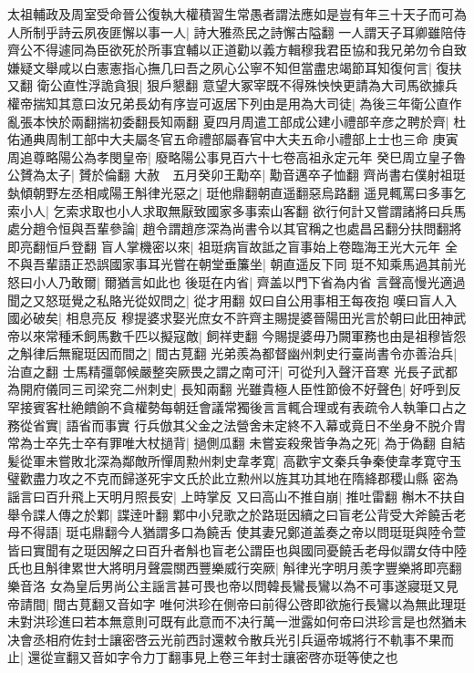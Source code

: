 太祖輔政及周室受命晉公復執大權積習生常愚者謂法應如是豈有年三十天子而可為人所制乎詩云夙夜匪懈以事一人|{
	詩大雅烝民之詩懈古隘翻}
一人謂天子耳卿雖陪侍齊公不得遽同為臣欲死於所事宜輔以正道勸以義方輯穆我君臣協和我兄弟勿令自致嫌疑文舉咸以白憲憲指心撫几曰吾之夙心公寧不知但當盡忠竭節耳知復何言|{
	復扶又翻}
衛公直性浮詭貪狠|{
	狠戶懇翻}
意望大冢宰既不得殊怏怏更請為大司馬欲據兵權帝揣知其意曰汝兄弟長幼有序豈可返居下列由是用為大司徒|{
	為後三年衛公直作亂張本怏於兩翻揣初委翻長知兩翻}
夏四月周遣工部成公建小禮部辛彦之聘於齊|{
	杜佑通典周制工部中大夫屬冬官五命禮部屬春官中大夫五命小禮部上士也三命}
庚寅周追尊略陽公為孝閔皇帝|{
	廢略陽公事見百六十七卷高祖永定元年}
癸巳周立皇子魯公贇為太子|{
	贇於倫翻}
大赦　五月癸卯王勱卒|{
	勱音邁卒子恤翻}
齊尚書右僕射祖珽埶傾朝野左丞相咸陽王斛律光惡之|{
	珽他鼎翻朝直遥翻惡烏路翻}
遥見輒罵曰多事乞索小人|{
	乞索求取也小人求取無厭致國家多事索山客翻}
欲行何計又嘗謂諸將曰兵馬處分趙令恒與吾輩參論|{
	趙令謂趙彦深為尚書令以其官稱之也處昌呂翻分扶問翻將即亮翻恒戶登翻}
盲人掌機密以來|{
	祖珽病盲故詆之盲事始上卷臨海王光大元年}
全不與吾輩語正恐誤國家事耳光嘗在朝堂垂簾坐|{
	朝直遥反下同}
珽不知乘馬過其前光怒曰小人乃敢爾|{
	爾猶言如此也}
後珽在内省|{
	齊盖以門下省為内省}
言聲高慢光適過聞之又怒珽覺之私賂光從奴問之|{
	從才用翻}
奴曰自公用事相王每夜抱嘆曰盲人入國必破矣|{
	相息亮反}
穆提婆求娶光庶女不許齊主賜提婆晉陽田光言於朝曰此田神武帝以來常種禾飼馬數千匹以擬寇敵|{
	飼祥吏翻}
今賜提婆毋乃闕軍務也由是祖穆皆怨之斛律后無寵珽因而間之|{
	間古莧翻}
光弟羨為都督幽州刺史行臺尚書令亦善治兵|{
	治直之翻}
士馬精彊鄣候嚴整突厥畏之謂之南可汗|{
	可從刋入聲汗音寒}
光長子武都為開府儀同三司梁兖二州刺史|{
	長知兩翻}
光雖貴極人臣性節儉不好聲色|{
	好呼到反}
罕接賓客杜絶饋餉不貪權勢每朝廷會議常獨後言言輒合理或有表疏令人執筆口占之務從省實|{
	語省而事實}
行兵倣其父金之法營舍未定終不入幕或竟日不坐身不脱介胄常為士卒先士卒有罪唯大杖撾背|{
	撾側瓜翻}
未嘗妄殺衆皆争為之死|{
	為于偽翻}
自結髪從軍未嘗敗北深為鄰敵所憚周勲州刺史韋孝寛|{
	高歡宇文秦兵争秦使韋孝寛守玉璧歡盡力攻之不克而歸遂死宇文氏於此立勲州以旌其功其地在隋絳郡稷山縣}
密為謡言曰百升飛上天明月照長安|{
	上時掌反}
又曰高山不推自崩|{
	推吐雷翻}
槲木不扶自舉令諜人傳之於鄴|{
	諜逹叶翻}
鄴中小兒歌之於路珽因續之曰盲老公背受大斧饒舌老母不得語|{
	珽屯鼎翻今人猶謂多口為饒舌}
使其妻兄鄭道盖奏之帝以問珽珽與陸令萱皆曰實聞有之珽因解之曰百升者斛也盲老公謂臣也與國同憂饒舌老母似謂女侍中陸氏也且斛律累世大將明月聲震關西豐樂威行突厥|{
	斛律光字明月羨字豐樂將即亮翻樂音洛}
女為皇后男尚公主謡言甚可畏也帝以問韓長鸞長鸞以為不可事遂寢珽又見帝請間|{
	間古莧翻又音如字}
唯何洪珍在側帝曰前得公啓即欲施行長鸞以為無此理珽未對洪珍進曰若本無意則可既有此意而不决行萬一泄露如何帝曰洪珍言是也然猶未决會丞相府佐封士讓密啓云光前西討還敕令散兵光引兵逼帝城將行不軌事不果而止|{
	還從宣翻又音如字令力丁翻事見上卷三年封士讓密啓亦珽等使之也}
